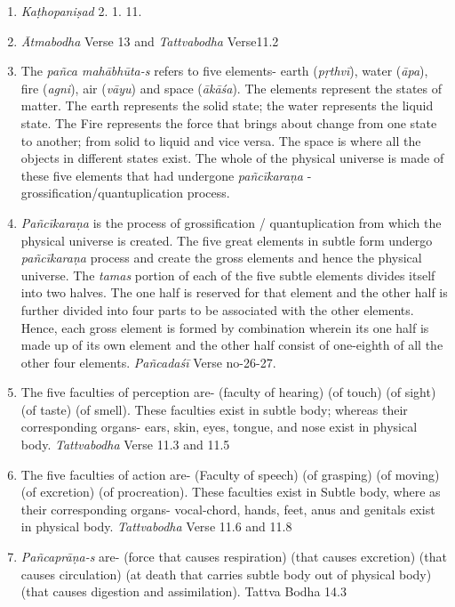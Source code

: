 \begin{enumerate}
\itemsep=0pt
\item
  \emph{Kaṭhopaniṣad} 2. 1. 11.
\item
  \emph{Ātmabodha} Verse 13 and \emph{Tattvabodha} Verse11.2
\item
  The \emph{pañca mahābhūta-s} refers to five elements- earth (\emph{pṛthvī}), water (\emph{āpa}), fire (\emph{agni}), air (\emph{vāyu}) and space (\emph{ākāśa}). The elements represent the states of matter. The earth represents the solid state; the water represents the liquid state. The Fire represents the force that brings about change from one state to another; from solid to liquid and vice versa. The space is where all the objects in different states exist. The whole of the physical universe is made of these five elements that had undergone \emph{pañcīkaraṇa} - grossification/quantuplication process.
\item
  \emph{Pañcīkaraṇa} is the process of grossification / quantuplication from which the physical universe is created. The five great elements in subtle form undergo \emph{pañcīkaraṇa} process and create the gross elements and hence the physical universe. The \emph{tamas} portion of each of the five subtle elements divides itself into two halves. The one half is reserved for that element and the other half is further divided into four parts to be associated with the other elements. Hence, each gross element is formed by combination wherein its one half is made up of its own element and the other half consist of one-eighth of all the other four elements. \emph{Pañcadaśī} Verse no-26-27.
\item
  The five faculties of perception are-  (faculty of hearing)  (of touch)  (of sight)  (of taste)  (of smell). These faculties exist in subtle body; whereas their corresponding organs- ears, skin, eyes, tongue, and nose exist in physical body. \emph{Tattvabodha} Verse 11.3 and 11.5
\item
  The five faculties of action are-  (Faculty of speech)  (of grasping)  (of moving)  (of excretion)  (of procreation). These faculties exist in Subtle body, where as their corresponding organs- vocal-chord, hands, feet, anus and genitals exist in physical body. \emph{Tattvabodha} Verse 11.6 and 11.8
\item
  \emph{Pañcaprāṇa-s} are-  (force that causes respiration)  (that causes excretion)  (that causes circulation)  (at death that carries subtle body out of physical body)  (that causes digestion and assimilation). Tattva Bodha 14.3

\end{enumerate}
